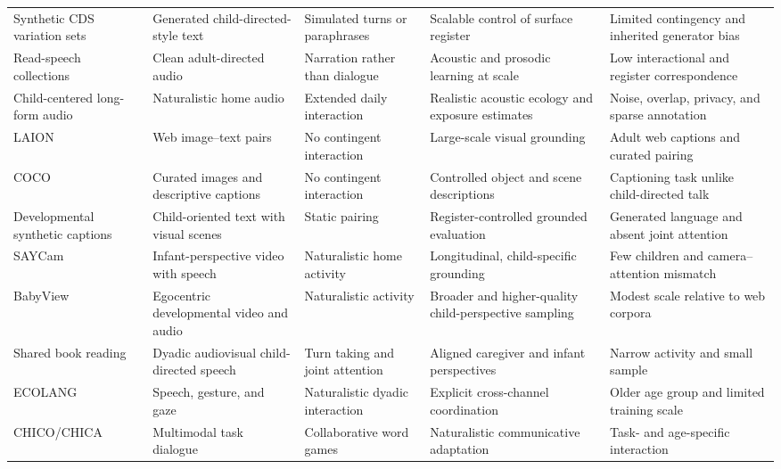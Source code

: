 \begin{longtable}{@{}p{}p{}p{}p{}p{}@{}}
Synthetic CDS variation sets \citep{haga2024babylm,LiuFourtassi2024} & Generated child-directed-style text & Simulated turns or paraphrases & Scalable control of surface register & Limited contingency and inherited generator bias \\
Read-speech collections \citep{Lavechin2023BabySLM} & Clean adult-directed audio & Narration rather than dialogue & Acoustic and prosodic learning at scale & Low interactional and register correspondence \\
Child-centered long-form audio \citep{cristia2020accuracy,bergelson2023everyday} & Naturalistic home audio & Extended daily interaction & Realistic acoustic ecology and exposure estimates & Noise, overlap, privacy, and sparse annotation \\
LAION \citep{schuhmann2022laion} & Web image--text pairs & No contingent interaction & Large-scale visual grounding & Adult web captions and curated pairing \\
COCO \citep{lin2014microsoft} & Curated images and descriptive captions & No contingent interaction & Controlled object and scene descriptions & Captioning task unlike child-directed talk \\
Developmental synthetic captions \citep{Wang2025} & Child-oriented text with visual scenes & Static pairing & Register-controlled grounded evaluation & Generated language and absent joint attention \\
SAYCam \citep{sullivan2021saycam,Vong2024} & Infant-perspective video with speech & Naturalistic home activity & Longitudinal, child-specific grounding & Few children and camera--attention mismatch \\
BabyView \citep{Long2024} & Egocentric developmental video and audio & Naturalistic activity & Broader and higher-quality child-perspective sampling & Modest scale relative to web corpora \\
Shared book reading \citep{ahamat2025shared} & Dyadic audiovisual child-directed speech & Turn taking and joint attention & Aligned caregiver and infant perspectives & Narrow activity and small sample \\
ECOLANG \citep{gu2025ecolang} & Speech, gesture, and gaze & Naturalistic dyadic interaction & Explicit cross-channel coordination & Older age group and limited training scale \\
CHICO/CHICA \citep{bodur2021chico,goumri2024chica} & Multimodal task dialogue & Collaborative word games & Naturalistic communicative adaptation & Task- and age-specific interaction \\
\end{longtable}
\endgroup


